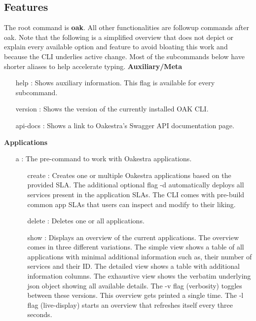 \subsection{Features}

The root command is \textbf{oak}.
All other functionalities are followup commands after oak.
Note that the following is a simplified overview that does not depict or explain every available option and feature to avoid bloating this work and because the CLI underlies active change.
Most of the subcommands below have shorter aliases to help accelerate typing.
\vspace{5mm}
\newline
\textbf{Auxiliary/Meta}
\begin{itemize}
    \item [help]:
        Shows auxiliary information.
        This flag is available for every subcommand.
    \item [version]:
        Shows the version of the currently installed OAK CLI.
    \item [api-docs]:
        Shows a link to Oakestra's Swagger API documentation page.
\end{itemize}
\vspace{5mm}
\textbf{Applications}
\begin{itemize}
    \item [a]:
        The pre-command to work with Oakestra applications.
        \begin{itemize}
            \item [create]:
                Creates one or multiple Oakestra applications based on the provided SLA.
                The additional optional flag -d automatically deploys all services present in the application SLAs.
                The CLI comes with pre-build common app SLAs that users can inspect and modify to their liking.
            \item [delete]:
                Deletes one or all applications.
            \item [show]:
                Displays an overview of the current applications.
                The overview comes in three different variations.
                The simple view shows a table of all applications with minimal additional information such as, their number of services and their ID.
                The detailed view shows a table with additional information columns.
                The exhaustive view shows the verbatim underlying json object showing all available details.
                The -v flag (verbosity) toggles between these versions.
                This overview gets printed a single time.
                The -l flag (live-display) starts an overview that refreshes itself every three seconds.
        \end{itemize}
\end{itemize}

